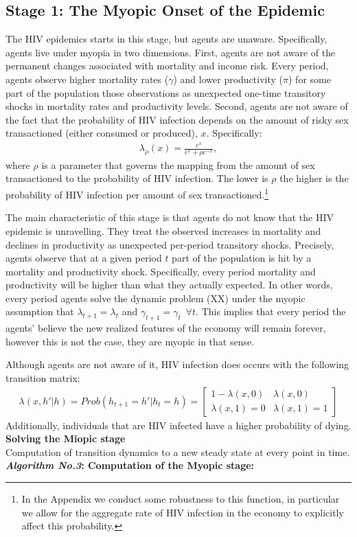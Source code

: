 \subsection*{\sf \textbf{Stage 1: The Myopic Onset of the Epidemic}}\label{sec:stage2}
The HIV epidemics starts in this stage, but agents are unaware. Specifically, agents live under myopia in two dimensions. First, agents are not aware of the permanent changes associated with mortality and income risk. Every period, agents observe higher mortality rates ($\gamma$) and lower productivity ($\pi$) for some part of the population  those observations as unexpected one-time transitory shocks in mortality rates and productivity levels. Second, agents are not aware of the fact that the probability of HIV infection depends on the amount of risky sex transactioned (either consumed or produced), $x$. Specifically:
\begin{align}\label{eq:HIV-Infection-Individual}
    \lambda_\rho(x)=\frac{e^{x}}{e^{x}+\rho e^{-x}},
\end{align}
where $\rho$ is a parameter that governs the mapping from the amount of sex transactioned to the probability of HIV infection. The lower is $\rho$ the higher is the probability of HIV infection per amount of sex transactioned.\footnote{\sf In the Appendix we conduct some robustness to this function, in particular we allow for the aggregate rate of HIV infection in the economy to explicitly affect this probability.} 

The main characteristic of this stage is that agents do not know that the HIV epidemic is unravelling. They treat the observed increases in mortality and declines in productivity as unexpected per-period transitory shocks. Precisely, agents  observe that at a given period $t$ part of the population is hit by a mortality and productivity shock. Specifically, every period mortality and productivity will be higher than what they actually expected. In other words, every period agents solve the dynamic problem (XX) under the myopic assumption that $\lambda_{t+1}=\lambda_{t}$ and $\gamma_{t+1}=\gamma_{t}\,\,\, \forall t$. This implies that every period the agents' believe the new realized features of the economy will remain forever, however this is not the case, they are myopic in that sense.
 
Although agents are not aware of it, HIV infection does occurs with the following transition matrix: 
\begin{align}
     \lambda(x,h'|h) = Prob(h_{t+1}=h'|h_{t}=h)=    \begin{bmatrix}%
    1-\lambda(x,0) & \lambda(x,0)\\
    \lambda(x,1)=0 & \lambda(x,1)=1
    \end{bmatrix}
\end{align}
Additionally, individuals that are HIV infected have a higher probability of dying.\\
\textbf{Solving the Miopic stage}\\
Computation of transition dynamics to a new steady state at every point in time.\\
\noindent \textbf{\textit{Algorithm No.3}: Computation of the Myopic stage:}\\

